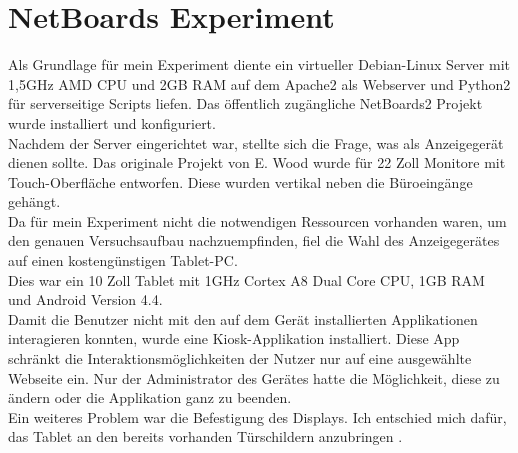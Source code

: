 \section{NetBoards Experiment}\label{NetBoards Experiment}
Als Grundlage für mein Experiment diente ein virtueller Debian-Linux Server mit 1,5GHz AMD CPU und 2GB RAM auf dem Apache2 als Webserver und Python2 für serverseitige Scripts liefen. Das öffentlich zugängliche NetBoards2 Projekt wurde installiert und konfiguriert.
\\
Nachdem der Server eingerichtet war, stellte sich die Frage, was als Anzeigegerät dienen sollte. Das originale Projekt von E. Wood wurde für 22 Zoll Monitore mit Touch-Oberfläche entworfen. Diese wurden vertikal neben die Büroeingänge gehängt.
\\
Da für mein Experiment nicht die notwendigen Ressourcen vorhanden waren, um den genauen Versuchsaufbau nachzuempfinden, fiel die Wahl des Anzeigegerätes auf einen kostengünstigen Tablet-PC.
\\
Dies war ein 10 Zoll Tablet mit 1GHz Cortex A8 Dual Core CPU, 1GB RAM und Android Version 4.4.
\\
Damit die Benutzer nicht mit den auf dem Gerät installierten Applikationen interagieren konnten, wurde eine Kiosk-Applikation installiert.
Diese App schränkt die Interaktionsmöglichkeiten der Nutzer nur auf eine ausgewählte Webseite ein. Nur der Administrator des Gerätes hatte die Möglichkeit, diese zu ändern oder die Applikation ganz zu beenden.
\\
Ein weiteres Problem war die Befestigung des Displays.
Ich entschied mich dafür, das Tablet an den bereits vorhanden Türschildern anzubringen .

